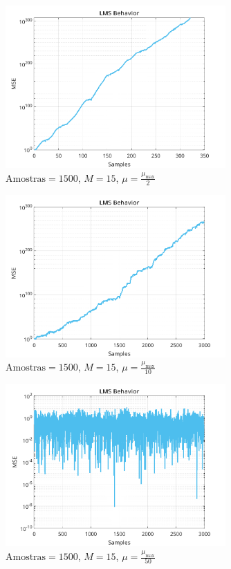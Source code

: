 \documentclass[a4paper,10pt]{article}
\begin{document}
\begin{enumerate}
				\begin{figure}[!ht]
					\centering
					\includegraphics[width=0.75\textwidth]{figs/L3Q5_mu_2.png}
					\caption{$\text{Amostras} = 1500$, $M = 15$, $\mu = \frac{\mu_{\text{max}}}{2}$}
					\label{fig:mu_2}
				\end{figure}

				\begin{figure}[!ht]
					\centering
					\includegraphics[width=0.75\textwidth]{figs/L3Q5_mu_10.png}
					\caption{$\text{Amostras} = 1500$, $M = 15$, $\mu = \frac{\mu_{\text{max}}}{10}$}
					\label{fig:mu_10}
				\end{figure}

				\begin{figure}[!ht]
					\centering
					\includegraphics[width=0.75\textwidth]{figs/L3Q5_mu_50.png}
					\caption{$\text{Amostras} = 1500$, $M = 15$, $\mu = \frac{\mu_{\text{max}}}{50}$}
					\label{fig:mu_50}
				\end{figure}


\end{enumerate}
\end{document}
